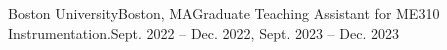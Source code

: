 \begin{rSubsection}{Boston University}{Boston, MA}{Graduate Teaching Assistant for ME310 Instrumentation.}{Sept. 2022 -- Dec. 2022, Sept. 2023 -- Dec. 2023}
\end{rSubsection} 
\vspace{0.1cm}
